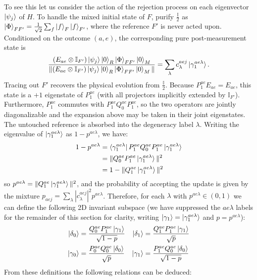 To see this let us consider the action of the rejection process on each eigenvector $\ket{\psi_j}$ of $H$. To handle the mixed initial state of $F$, purify $\frac{\mathbb{I}}{2}$ as $\ket{\Phi}_{FF'}=\frac{1}{\sqrt{2}}\sum_f\ket{f}_F\ket{f}_{F'}$, where the reference $F'$ is never acted upon. Conditioned on the outcome $(a,e)$, the corresponding pure post-measurement state is
\begin{equation}
    \frac{(E_{ae}\otimes\mathbb I_{F'})\ket{\psi_j}\ket{0}_R\ket{\Phi}_{FF'}\ket{0}_M}
    {\|(E_{ae}\otimes\mathbb I_{F'})\ket{\psi_j}\ket{0}_R\ket{\Phi}_{FF'}\ket{0}_M\|}
    = \sum_{\lambda} c_{\lambda}^{aej}\ket{\gamma_1^{ae \lambda}}.
\end{equation}
Tracing out $F'$ recovers the physical evolution from $\frac{\mathbb{I}}{2}$. Because $P_1^{ae}E_{ae}=E_{ae}$, this state is a $+1$ eigenstate of $P_1^{ae}$ (with all projectors implicitly extended by $\mathbb I_{F'}$). Furthermore, $P_1^{ae}$ commutes with $P^{ae}_1Q^{ae}_0P^{ae}_1$, so the two operators are jointly diagonalizable and the expansion above may be taken in their joint eigenstates. The untouched reference is absorbed into the degeneracy label $\lambda$.
Writing the eigenvalue of $\ket{\gamma^{ae\lambda}_1}$ as $1-p^{ae\lambda}$, we have: \begin{align}1-p^{ae\lambda}&=\bra{\gamma^{ae\lambda}_1}P^{ae}_1Q^{ae}_0P^{ae}_1\ket{\gamma^{ae\lambda}_1} \\&=\|Q^{ae}_0P^{ae}_1\ket{\gamma^{ae\lambda}_1}\|^2\\ &= 1-\|Q^{ae}_1\ket{\gamma^{ae\lambda}_1}\|^2
\end{align}
so $p^{ae\lambda} = \|Q^{ae}_1\ket{\gamma^{ae\lambda}_1}\|^2$, and the probability of accepting the update is given by the mixture $p_{aej} = \sum_{\lambda}|c^{aej}_{\lambda}|^2p^{ae\lambda}$. Therefore, for each $\lambda$ with $p^{ae\lambda} \in (0,1)$ we can define the following 2D invariant subspace (we have suppressed the $ae\lambda$ labels for the remainder of this section for clarity, writing $\ket{\gamma_1} = \ket{\gamma^{ae\lambda}_1}$ and $p = p^{ae\lambda}$):
\begin{align}
    \ket{\delta_0} &= \frac{Q^{ae}_0P^{ae}_1\ket{\gamma_1}}{\sqrt{1-p}} &\ket{\delta_1} &= \frac{Q^{ae}_1P^{ae}_1\ket{\gamma_1}}{\sqrt{p}} \\
    \ket{\gamma_0} &= \frac{P^{ae}_0Q^{ae}_0\ket{\delta_0}}{\sqrt{p}} &\ket{\gamma_1} &= \frac{P^{ae}_1Q^{ae}_0\ket{\delta_0}}{\sqrt{1-p}}
\end{align}
From these definitions the following relations can be deduced:
